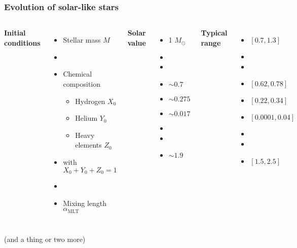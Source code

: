 \documentclass[10pt, compress]{beamer}
\begin{document}
\begin{frame}[fragile] \frametitle{Evolution of solar-like stars}
    \begin{columns}[t,onlytextwidth]
        \textbf{Initial conditions}
        \begin{itemize}
            \item Stellar mass $M$
            \item[]
            \item Chemical composition \\
            \begin{itemize}
                \item Hydrogen $X_0$
                \item Helium $Y_0$
                \item Heavy elements $Z_0$
            \end{itemize}
            \item[] with $X_0+Y_0+Z_0=1$
            \item[]
            \item Mixing length $\alpha_{\text{MLT}}$
        \end{itemize}
        
        \textbf{Solar value}
        \begin{itemize}
            \item[] 1 $M_\odot$
            \item[]
            \item[]
            \item[] $\sim 0.7$
            \item[] $\sim 0.275$
            \item[] $\sim 0.017$
            \item[]
            \item[]
            \item[] $\sim 1.9$
        \end{itemize}
        
        \textbf{Typical range} 
        \begin{itemize}
            \item[] $[0.7, 1.3]$
            \item[]
            \item[] 
            \item[] $[0.62, 0.78]$
            \item[] $[0.22, 0.34]$
            \item[] $[0.0001, 0.04]$
            \item[]
            \item[]
            \item[] $[1.5, 2.5]$
        \end{itemize}
    \end{columns}
    \vspace{5mm}
    {\tiny (and a thing or two more)}
\end{frame}
\end{document}
